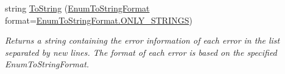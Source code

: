 \begin{DoxyCompactItemize}
string \mbox{\hyperlink{class_c_s_i_1_1_library_1_1_errors_1_1_error_list_a61a012335bd3bea9beaa53dadcb9209a}{To\+String}} (\mbox{\hyperlink{class_c_s_i_1_1_library_1_1_errors_1_1_error_list_aa208d07fb97d8c5eaa0910fde0c7921e}{Enum\+To\+String\+Format}} format=\mbox{\hyperlink{class_c_s_i_1_1_library_1_1_errors_1_1_error_list_aa208d07fb97d8c5eaa0910fde0c7921ead28d2b7c61d16fdb9ede7dc09e9cf481}{Enum\+To\+String\+Format.\+O\+N\+L\+Y\+\_\+\+S\+T\+R\+I\+N\+GS}})
\begin{DoxyCompactList}\small\item\em Returns a string containing the error information of each error in the list separated by new lines. The format of each error is based on the specified Enum\+To\+String\+Format. \end{DoxyCompactList}\end{DoxyCompactItemize}
